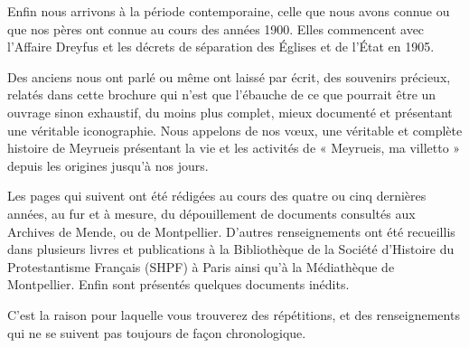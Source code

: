 Enfin nous arrivons à la période contemporaine, celle que nous avons connue ou que nos pères ont connue au cours des années 1900. Elles commencent avec l'Affaire Dreyfus et les décrets de séparation des Églises et de l’État en 1905.

Des anciens nous ont parlé ou même ont laissé par écrit, des souvenirs précieux, relatés dans cette brochure qui n’est que l’ébauche de ce que pourrait être un ouvrage sinon exhaustif, du moins plus complet, mieux documenté et présentant une véritable iconographie. Nous appelons de nos vœux, une véritable et complète histoire de Meyrueis présentant la vie et les activités de « Meyrueis, ma villetto » depuis les origines jusqu’à nos jours.

\vspace{0.35em}

\begin{tcolorbox}[
  colback=white,
  colframe=black,
  boxrule=0.7pt,
  arc=0pt,
  left=0.25cm,
  right=0.25cm,
  top=0.12cm,
  bottom=0.12cm,
  boxsep=0pt
]
\small
Les pages qui suivent ont été rédigées au cours des quatre ou cinq dernières années, au fur et à mesure, du dépouillement de documents consultés aux Archives de Mende, ou de Montpellier. D’autres renseignements ont été recueillis dans plusieurs livres et publications à la Bibliothèque de la Société d’Histoire du Protestantisme Français (SHPF) à Paris ainsi qu’à la Médiathèque de Montpellier. Enfin sont présentés quelques documents inédits.

C’est la raison pour laquelle vous trouverez des répétitions, et des renseignements qui ne se suivent pas toujours de façon chronologique.
\end{tcolorbox}



